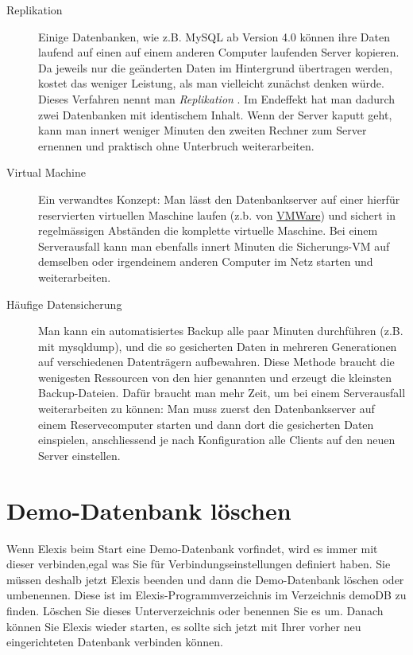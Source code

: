 \begin{description}
\item[ Replikation ] Einige Datenbanken, wie z.B. MySQL ab Version 4.0 können ihre Daten laufend auf einen
auf einem anderen Computer laufenden Server kopieren. Da jeweils nur die geänderten Daten im Hintergrund
übertragen werden, kostet das weniger Leistung, als man vielleicht zunächst denken würde. Dieses Verfahren 
nennt man \textit{Replikation} . Im Endeffekt hat man dadurch zwei Datenbanken mit identischem Inhalt. 
Wenn der Server kaputt geht, kann man innert weniger Minuten den zweiten Rechner zum Server ernennen und
praktisch ohne Unterbruch weiterarbeiten.
\item [Virtual Machine] Ein verwandtes Konzept: Man lässt den Datenbankserver auf einer hierfür reservierten
 virtuellen Maschine laufen (z.b. von \href{http://www.vmware.com/}{VMWare}) und sichert in regelmässigen
 Abständen die komplette virtuelle Maschine. Bei einem Serverausfall kann man ebenfalls innert Minuten die
 Sicherungs-VM auf demselben oder irgendeinem anderen Computer im Netz starten und weiterarbeiten.
\item [Häufige Datensicherung] Man kann ein automatisiertes Backup alle paar Minuten durchführen
 (z.B. mit mysqldump), und die so gesicherten Daten in mehreren Generationen auf verschiedenen Datenträgern
 aufbewahren. Diese Methode braucht die wenigesten Ressourcen von den hier genannten und erzeugt die kleinsten
 Backup-Dateien. Dafür braucht man mehr Zeit, um bei einem Serverausfall weiterarbeiten zu können: Man muss
 zuerst den Datenbankserver auf einem Reservecomputer starten und dann dort die gesicherten Daten einspielen,
 anschliessend je nach Konfiguration alle Clients auf den neuen Server einstellen.
\end{description}

\section{Demo-Datenbank löschen}
Wenn Elexis beim Start eine Demo-Datenbank vorfindet, wird es immer mit dieser
verbinden,egal was Sie für Verbindungseinstellungen definiert haben. Sie müssen
deshalb jetzt Elexis beenden und dann die Demo-Datenbank löschen oder
umbenennen. Diese ist im Elexis-Programmverzeichnis im Verzeichnis \glqq
demoDB\grqq{} zu finden. Löschen Sie dieses Unterverzeichnis oder benennen Sie
es um. Danach können Sie Elexis wieder starten, es sollte sich jetzt mit Ihrer
vorher neu eingerichteten Datenbank verbinden können.

